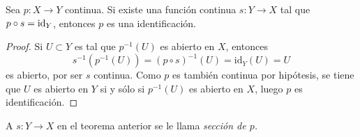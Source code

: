 
\begin{theorem}
Sea $p : X \longrightarrow Y$ continua. Si existe una función continua $s : Y \longrightarrow X$ tal que $p \circ s = \textnormal{id}_Y$, entonces $p$ es una identificación.
\end{theorem}

\begin{proof}
Si $U \subset Y$ es tal que $p^{-1}(U)$ es abierto en $X$, entonces 
\begin{equation*}
    s^{-1}(p^{-1}(U)) = (p \circ s)^{-1}(U) = \text{id}_Y(U) = U
\end{equation*}
es abierto, por ser $s$ continua. Como $p$ es también continua por hipótesis, se tiene que $U$ es abierto en $Y$ si y sólo si $p^{-1}(U)$ es abierto en $X$, luego $p$ es identificación.
\end{proof}

\begin{definition}
A $s : Y \longrightarrow X$ en el teorema anterior se le llama \itshape{sección} de $p$.
\end{definition}
